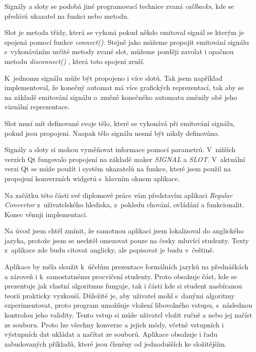
Signály a sloty se podobá jiné programovací technice zvaná \textit{callbacks}, kde se předává ukazatel na funkci nebo metodu. 

Slot je metoda třídy, která se vykoná pokud někdo emitoval signál se kterým je spojená pomocí funkce \textit{connect()}. Stejně jako můžeme propojit emitování signálu s~vykonáváním určité metody zvané slot, můžeme později zavolat i opačnou metodu \textit{disconnect()} , která toto spojení zruší. 

K~jednomu signálu může být propojeno i více slotů. Tak jsem například implementoval, že konečný automat má více grafických reprezentací, tak aby se na základě emitování signálu o~změně konečného automatu změnily obě jeho vizuální reprezentace.

Slot musí mít definované svoje tělo, které se vykonává při emitování signálu, pokud jsou propojeni. Naopak tělo signálu nesmí být nikdy definováno.

Signály a sloty si mohou vyměňovat informace pomocí parametrů. V~nižších verzích Qt fungovalo propojení na základě maker \textit{SIGNAL} a \textit{SLOT}. V~aktuální verzi Qt se může použít i systém ukazatelů na funkce, které jsem použil na propojení konverzních widgetů s~hlavním oknem aplikace.



Na začátku této části své diplomové práce vám představím aplikaci \textit{Regular Convertor} z~uživatelského hlediska, z~pohledu chování, ovládání a funkcionalit. Konec věnuji implementaci. 

Na úvod jsem chtěl zmínit, že samotnou aplikaci jsem lokalizoval do anglického jazyka, protože jsem se nechtěl omezovat pouze na česky mluvící studenty.
Texty z~aplikace zde budu citovat anglicky, ale popisovat je budu v~češtině. 

Aplikace by měla sloužit k~účelům prezentace formálních jazyků na přednáškách a zároveň i k~samostatnému procvičení studenty. Proto obsahuje část, kde se prezentuje jak vlastní algoritmus funguje, tak i části kde si student nasbíranou teorii prakticky vyzkouší. Důležité je, aby uživatel mohl s~danými algoritmy experimentovat, proto program umožňuje vložení libovolného vstupu, s~následnou kontrolou jeho validity. Tento vstup si může uživatel vložit ručně a nebo jej načíst ze souboru. Proto lze všechny konverze a jejich módy, včetně vstupních i výstupních dat ukládat a načítat ze souborů. Aplikace obsahuje i řadu zabudovaných příkladů, které jsou členěny od jednodušších ke složitějším.

